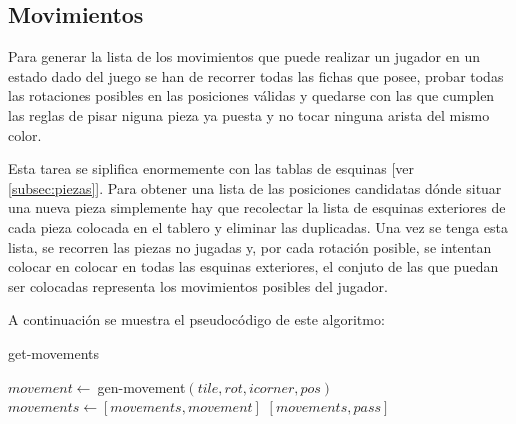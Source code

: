 \subsection{Movimientos}

Para generar la lista de los movimientos que puede realizar un jugador en un
estado dado del juego se han de recorrer todas las fichas que posee, probar
todas las rotaciones posibles en las posiciones válidas y quedarse con las que
cumplen las reglas de pisar niguna pieza ya puesta y no tocar ninguna arista del
mismo color.

Esta tarea se siplifica enormemente con las tablas de esquinas [ver
\ref{subsec:piezas}]. Para obtener una lista de las posiciones candidatas dónde
situar una nueva pieza simplemente hay que recolectar la lista de esquinas
exteriores de cada pieza colocada en el tablero y eliminar las duplicadas. Una
vez se tenga esta lista, se recorren las piezas no jugadas y, por cada rotación
posible, se intentan colocar en colocar en todas las esquinas exteriores, el
conjuto de las que puedan ser colocadas representa los movimientos posibles del
jugador.

A continuación se muestra el pseudocódigo de este algoritmo:

\begin{algorithm}
\caption{get-movements}\label{get-movements}
\begin{algorithmic}
					\State $movement \gets\ $gen-movement$(tile, rot, icorner, pos)$
						\State $movements \gets [movements, movement]$
					\EndIf
				\EndFor
			\EndFor
		\EndFor
	\EndFor
	\State \Return $[movements, pass]$ 
	\EndFunction
\end{algorithmic}
\end{algorithm}
